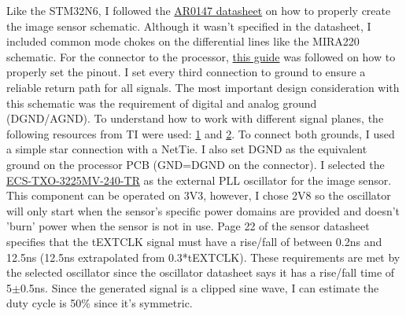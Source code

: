 Like the STM32N6, I followed the \href{https://edit.wpgdadawant.com/uploads/news_file/program/2021/36761/tech_files/program_36761_suggest_other_file.PDF?}{AR0147 datasheet} on how to properly create the image sensor schematic.
Although it wasn't specified in the datasheet, I included common mode chokes on the differential lines like the MIRA220 schematic.
\nl
For the connector to the processor, \href{https://blog.arducam.com/raspberry-pi-camera/connector-type-pinout/}{this guide} was followed on how to properly set the pinout. I set every third connection to ground to ensure a reliable return path for all signals.
\nl
The most important design consideration with this schematic was the requirement of digital and analog ground (DGND/AGND). To understand how to work with different signal planes, the following resources from TI were used: \href{https://www.ti.com/lit/an/slyt499/slyt499.pdf?ts=1756814995128&ref_url=https%3A%2F%2Fwww.google.com%2F}{1} and \href{https://www.ti.com/lit/an/slyt512/slyt512.pdf?ts=1756824651700&ref_url=https%3A%2F%2Fwww.google.com%2F}{2}.
To connect both grounds, I used a simple star connection with a NetTie. I also set DGND as the equivalent ground on the processor PCB (GND=DGND on the connector).
\nl
I selected the \href{https://au.mouser.com/ProductDetail/ECS/ECS-TXO-3225MV-240-TR?qs=d0WKAl%252BL4KYXn7UuwSFJGQ%3D%3D&srsltid=AfmBOoqlFJCYyqd6MzLT63_Pw_wqXWR5Bv4SHlYdyhoVLS8l8SGV9TkK}{ECS-TXO-3225MV-240-TR} as the external PLL oscillator for the image sensor. This component can be operated on 3V3, however, I chose 2V8 so the oscillator will only start when the sensor's specific power domains are provided and doesn't 'burn' power when the sensor is not in use.
Page 22 of the sensor datasheet specifies that the tEXTCLK signal must have a rise/fall of between 0.2ns and 12.5ns (12.5ns extrapolated from 0.3*tEXTCLK). These requirements are met by the selected oscillator since the oscillator datasheet says it has a rise/fall time of 5$\pm$0.5ns. Since the generated signal is a clipped sine wave, I can estimate the duty cycle is 50\% since it's symmetric.
